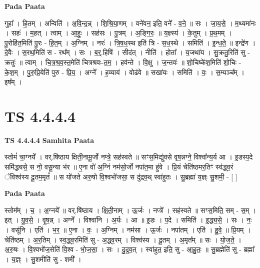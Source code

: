 \documentclass[17pt]{extarticle}
\begin{document}
\textbf{Pada Paata} \newline

गुहा᳚ । हि॒तम् । अन्विति॑ । अ॒वि॒न्द॒न्न् । शि॒श्रि॒या॒णम् । वने॑वन॒ इति॒ वने᳚ - व॒ने॒ ॥ सः । जा॒य॒से॒ । म॒थ्यमा॑नः । सहः॑ । म॒हत् । त्वाम् । आ॒हुः॒ । सह॑सः । पु॒त्रम् । अ॒ङ्गि॒रः॒ ॥ य॒ज्ञ्स्य॑ । के॒तुम् । प्र॒थ॒मम् । पु॒रोहि॑त॒मिति॑ पु॒रः - हि॒त॒म् । अ॒ग्निम् । नरः॑ । त्रि॒ष॒ध॒स्थ इति॑ त्रि - स॒ध॒स्थे । समिति॑ । इ॒न्ध॒ते॒ ॥ इन्द्रे॑ण । दे॒वैः । स॒रथ॒मिति॑ स - रथ᳚म् । सः । ब॒र्॒.हिषि॑ । सीद॑त् । नीति॑ । होता᳚ । य॒जथा॑य । सु॒क्रतु॒रिति॑ सु - क्रतुः॑ ॥ त्वाम् । चि॒त्र॒श्र॒व॒स्त॒मेति॑ चित्रश्रवः-त॒म॒ । हव॑न्ते । वि॒क्षु । ज॒न्तवः॑ ॥ शो॒चिष्के॑श॒मिति॑ शो॒चिः - के॒श॒म् । पु॒रु॒प्रि॒येति॑ पुरु - प्रि॒य॒ । अग्ने᳚ । ह॒व्याय॑ । वोढ॑वे ॥ सखा॑यः । समिति॑ । वः॒ । स॒म्यञ्च᳚म् । इष᳚म् ।  \newline





\section{ TS 4.4.4.4 }

\textbf{TS 4.4.4.4 } \newline
\textbf{Samhita Paata} \newline

स्तोमं॑ चा॒ग्नये᳚ । वर्.षि॑ष्ठाय क्षिती॒नामू॒र्जो नप्त्रे॒ सह॑स्वते ॥ सꣳस॒मिद्यु॑वसे वृष॒न्नग्ने॒ विश्वा᳚न्य॒र्य आ । इ॒डस्प॒दे समि॑द्ध्यसे॒ स नो॒ वसू॒न्या भ॑र ॥ ए॒ना वो॑ अ॒ग्निं नम॑सो॒र्जो नपा॑त॒मा हु॑वे । प्रि॒यं चेति॑ष्ठमर॒तिꣳ स्व॑द्ध्व॒रं ॅविश्व॑स्य दू॒तम॒मृतं᳚ ॥ स यो॑जते अरु॒षो वि॒श्वभो॑जसा॒ स दु॑द्रव॒थ् स्वा॑हुतः । सु॒ब्रह्मा॑ य॒ज्ञ्ः सु॒शमी॒ - [  ] \newline

\textbf{Pada Paata} \newline

स्तोम᳚म् । च॒ । अ॒ग्नये᳚ ॥ वर्.षि॑ष्ठाय । क्षि॒ती॒नाम् । ऊ॒र्जः । नप्त्रे᳚ । सह॑स्वते ॥ सꣳस॒मिति॒ सम् - स॒म् । इत् । यु॒व॒से॒ । वृ॒ष॒न्न् । अग्ने᳚ । विश्वा॑नि । अ॒र्यः । आ ॥ इ॒डः । प॒दे । समिति॑ । इ॒द्ध्य॒से॒ । सः । नः॒ । वसू॑नि । एति॑ । भ॒र॒ ॥ ए॒ना । वः॒ । अ॒ग्निम् । नम॑सा । ऊ॒र्जः । नपा॑तम् । एति॑ । हु॒वे॒ ॥ प्रि॒यम् । चेति॑ष्ठम् । अ॒र॒तिम् । स्व॒द्ध्व॒रमिति॑ सु - अ॒द्ध्व॒रम् । विश्व॑स्य । दू॒तम् । अ॒मृत᳚म् ॥ सः । यो॒ज॒ते॒ । अ॒रु॒षः । वि॒श्वभो॑ज॒सेति॑ वि॒श्व - भो॒ज॒सा॒ । सः । दु॒द्र॒व॒त् । स्वा॑हुत॒ इति॒ सु - आ॒हु॒तः॒ ॥ सु॒ब्रह्मेति॑ सु - ब्रह्मा᳚ । य॒ज्ञ्ः । सु॒शमीति॑ सु - शमी᳚ ।  \newline
\end{document}

